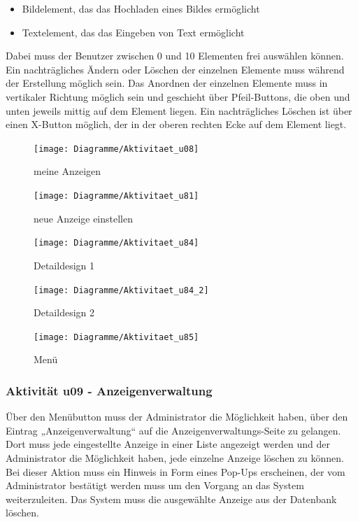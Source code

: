 \documentclass[a4paper,12pt,oneside]{scrartcl}
\begin{document}
\begin{itemize}
	\item Bildelement, das das Hochladen eines Bildes ermöglicht
	\item Textelement, das das Eingeben von Text ermöglicht
\end{itemize}
Dabei muss der Benutzer zwischen 0 und 10 Elementen frei auswählen können.
Ein nachträgliches Ändern oder Löschen der einzelnen Elemente muss während der Erstellung möglich sein.
Das Anordnen der einzelnen Elemente muss in vertikaler Richtung möglich sein und geschieht über Pfeil-Buttons, die oben und unten jeweils mittig auf dem Element liegen.
Ein nachträgliches Löschen ist über einen X-Button möglich, der in der oberen rechten Ecke auf dem Element liegt.

\begin{figure}[!htbp]
\centering
\noindent\texttt{[image: Diagramme/Aktivitaet\_u08]}
\caption{meine Anzeigen}
\end{figure}
\FloatBarrier

\begin{figure}[!htbp]
\centering
\noindent\texttt{[image: Diagramme/Aktivitaet\_u81]}
\caption{neue Anzeige einstellen}
\end{figure}
\FloatBarrier

\begin{figure}[!htbp]
\centering
\noindent\texttt{[image: Diagramme/Aktivitaet\_u84]}
\caption{Detaildesign 1}
\end{figure}
\FloatBarrier

\begin{figure}[!htbp]
\centering
\noindent\texttt{[image: Diagramme/Aktivitaet\_u84\_2]}
\caption{Detaildesign 2}
\end{figure}
\FloatBarrier

\begin{figure}[!htbp]
\centering
\noindent\texttt{[image: Diagramme/Aktivitaet\_u85]}
\caption{Menü}
\end{figure}
\FloatBarrier

\subsubsection{Aktivität u09 - Anzeigenverwaltung}
Über den Menübutton muss der Administrator die Möglichkeit haben, über den Eintrag „Anzeigenverwaltung“ auf die Anzeigenverwaltungs-Seite zu gelangen. 
Dort muss jede eingestellte Anzeige in einer Liste angezeigt werden und der Administrator die Möglichkeit haben, jede einzelne Anzeige löschen zu können. 
Bei dieser Aktion muss ein Hinweis in Form eines Pop-Ups erscheinen, der vom Administrator bestätigt werden muss um den Vorgang an das System weiterzuleiten. 
Das System muss die ausgewählte Anzeige aus der Datenbank löschen.
\end{document}
